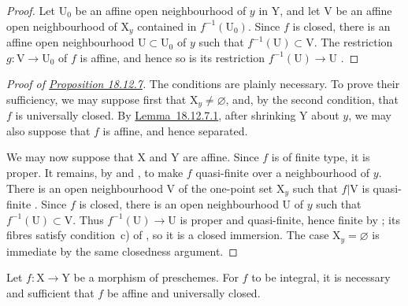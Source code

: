 \begin{proof}
Let $\mathrm{U}_0$ be an affine open neighbourhood of $y$ in $\mathrm{Y}$, and let $\mathrm{V}$ be an affine open neighbourhood of $\mathrm{X}_y$ contained in $f^{-1}(\mathrm{U}_0)$. Since $f$ is closed, there is an affine open neighbourhood $\mathrm{U}\subset\mathrm{U}_0$ of $y$ such that $f^{-1}(\mathrm{U})\subset\mathrm{V}$. The restriction $g:\mathrm{V}\to\mathrm{U}_0$ of $f$ is affine, and hence so is its restriction $f^{-1}(\mathrm{U})\to\mathrm{U}$ .
\end{proof}

\begin{proof}[Proof of {\hyperref[IV.18.12.7]{Proposition 18.12.7}}]
The conditions are plainly necessary. To prove their sufficiency, we may suppose first that $\mathrm{X}_y\ne\varnothing$, and, by the second condition, that $f$ is universally closed. By {\hyperref[IV.18.12.7.1]{Lemma~18.12.7.1}}, after shrinking $\mathrm{Y}$ about $y$, we may also suppose that $f$ is affine, and hence separated.

We may now suppose that $\mathrm{X}$ and $\mathrm{Y}$ are affine. Since $f$ is of finite type, it is proper. It remains, by  and , to make $f$ quasi-finite over a neighbourhood of $y$. There is an open neighbourhood $\mathrm{V}$ of the one-point set $\mathrm{X}_y$ such that $f|\mathrm{V}$ is quasi-finite . Since $f$ is closed, there is an open neighbourhood $\mathrm{U}$ of $y$ such that $f^{-1}(\mathrm{U})\subset\mathrm{V}$. Thus $f^{-1}(\mathrm{U})\to\mathrm{U}$ is proper and quasi-finite, hence finite by ; its fibres satisfy condition~c) of , so it is a closed immersion. The case $\mathrm{X}_y=\varnothing$ is immediate by the same closedness argument.
\end{proof}

\begin{proposition}[18.12.8]
\label{IV.18.12.8}
Let $f:\mathrm{X}\to\mathrm{Y}$ be a morphism of preschemes.
For $f$ to be integral, it is necessary and sufficient that $f$ be affine and universally closed.
\end{proposition}

